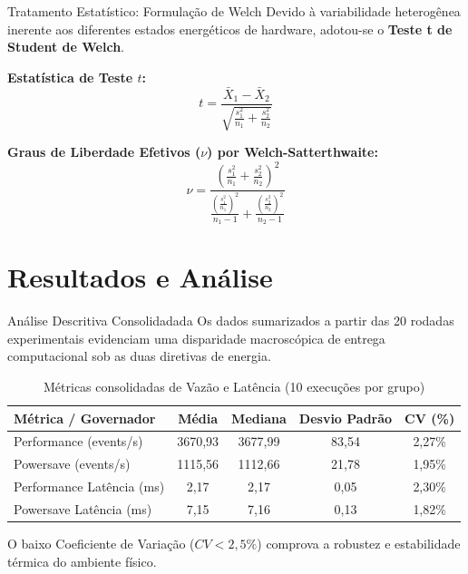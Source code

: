 \documentclass[aspectratio=169,10pt]{beamer}
\begin{document}
\begin{frame}{Tratamento Estatístico: Formulação de Welch}
    Devido à variabilidade heterogênea inerente aos diferentes estados energéticos de hardware, adotou-se o \textbf{Teste t de Student de Welch}.

    \vspace{0.2cm}
    \textbf{Estatística de Teste $t$:}
    \begin{equation}
        t = \frac{\bar{X}_1 - \bar{X}_2}{\sqrt{\frac{s_1^2}{n_1} + \frac{s_2^2}{n_2}}}
    \end{equation}

    \textbf{Graus de Liberdade Efetivos ($\nu$) por Welch-Satterthwaite:}
    \begin{equation}
        \nu = \frac{\left( \frac{s_1^2}{n_1} + \frac{s_2^2}{n_2} \right)^2}{\frac{\left(\frac{s_1^2}{n_1}\right)^2}{n_1 - 1} + \frac{\left(\frac{s_2^2}{n_2}\right)^2}{n_2 - 1}}
    \end{equation}
\end{frame}


\section{Resultados e Análise}

\begin{frame}{Análise Descritiva Consolidadada}
    Os dados sumarizados a partir das 20 rodadas experimentais evidenciam uma disparidade macroscópica de entrega computacional sob as duas diretivas de energia.

    \begin{table}
        \centering
        \caption{Métricas consolidadas de Vazão e Latência (10 execuções por grupo)}
        \label{tab:resultados_reais}
        \begin{tabular}{lcccc}
            \toprule
            \textbf{Métrica / Governador} & \textbf{Média} & \textbf{Mediana} & \textbf{Desvio Padrão} & \textbf{CV (\%)} \\
            \midrule
            Performance (events/s)    & 3670,93 & 3677,99 & 83,54 & 2,27\% \\
            Powersave (events/s)      & 1115,56 & 1112,66 & 21,78 & 1,95\% \\
            \midrule
            Performance Latência (ms) & 2,17    & 2,17    & 0,05  & 2,30\% \\
            Powersave Latência (ms)   & 7,15    & 7,16    & 0,13  & 1,82\% \\
            \bottomrule
        \end{tabular}
    \end{table}
    \footnotesize
    O baixo Coeficiente de Variação ($CV < 2,5\%$) comprova a robustez e estabilidade térmica do ambiente físico.
\end{frame}
\end{document}
